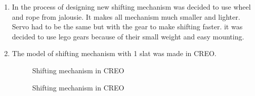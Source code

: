 \begin{enumerate}
 \item In the process of designing new shifting mechanism was decided to use wheel and rope from jalousie. It makes all mechanism much smaller and lighter. Servo had to be the same but with the gear to make shifting faster. it was decided to use lego gears because of their small weight and easy mounting.   
  
   \item The model of shifting mechanism with 1 slat was made in CREO. 
   \begin{figure}[H]
     \begin{minipage}[h]{0.49\linewidth}
 		\caption{Shifting mechanism in CREO}
 	 \end{minipage} 
 	 \begin{minipage}[h]{0.49\linewidth}
 		\caption{Shifting mechanism in CREO}
 	 \end{minipage}
   \end{figure}
 
 \end{enumerate}	

\fillpage